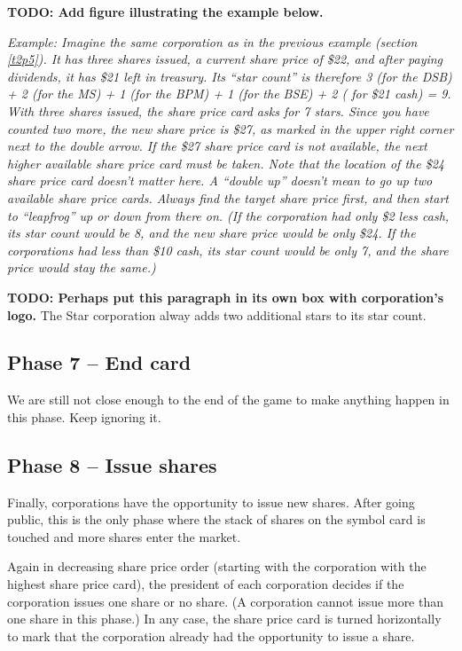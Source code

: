 \documentclass[10pt,final]{report}
\begin{document}
\begin{multicols}{2}
\textbf{TODO: Add figure illustrating the example below.}

\emph{Example: Imagine the same corporation as in the previous example
  (section \ref{t2p5}). It has three shares issued, a current share
  price of \$22, and after paying dividends, it has \$21 left in
  treasury. Its ``star count'' is therefore 3 (for the DSB) + 2 (for
  the MS) + 1 (for the BPM) + 1 (for the BSE) + 2 ( for \$21 cash) =
  9. With three shares issued, the share price card asks for 7
  stars. Since you have counted two more, the new share price is \$27,
  as marked in the upper right corner next to the double arrow. If the
  \$27 share price card is not available, the next higher available
  share price card must be taken. Note that the location of the \$24
  share price card doesn't matter here. A ``double up'' doesn't mean
  to go up two available share price cards. Always find the target
  share price first, and then start to ``leapfrog'' up or down from
  there on. (If the corporation had only \$2 less cash, its star count
  would be 8, and the new share price would be only \$24. If the
  corporations had less than \$10 cash, its star count would be only
  7, and the share price would stay the same.)}

\textbf{TODO: Perhaps put this paragraph in its own box with
  corporation's logo.} The Star corporation alway adds two additional
stars to its star count.

\subsection{Phase 7 -- End card}

We are still not close enough to the end of the game to make anything
happen in this phase. Keep ignoring it.

\subsection{Phase 8 -- Issue shares}
\label{t2p8}

Finally, corporations have the opportunity to issue new shares. After
going public, this is the only phase where the stack of shares on the
symbol card is touched and more shares enter the market.

Again in decreasing share price order (starting with the corporation
with the highest share price card), the president of each corporation
decides if the corporation issues one share or no share. (A
corporation cannot issue more than one share in this phase.) In any
case, the share price card is turned horizontally to mark that the
corporation already had the opportunity to issue a share.


\end{multicols}
\end{document}
